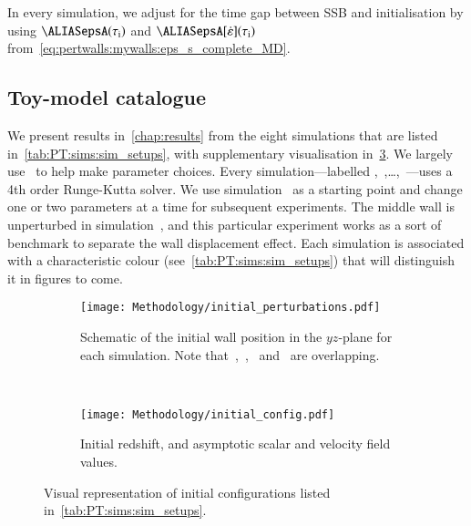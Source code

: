 
    In every simulation, we adjust for the time gap between SSB and initialisation %
    by using $\epsA(\tau\ped{i})$ and $\epsA[\dot{\varepsilon}](\tau\ped{i})$ from~\cref{eq:pertwalls:mywalls:eps_s_complete_MD}.







\subsection{Toy-model catalogue}

   


    We present results in~\cref{chap:results} from the eight simulations that are listed in~\cref{tab:PT:sims:sim_setups}, with supplementary visualisation in~\cref{fig:PT:sims:initial_configs}. %
    We largely use~\citet{christiansenAsimulationDomainFormation2024} to help make parameter choices. 
    Every simulation---labelled ,~,\dots,~---uses a 4th order Runge-Kutta solver. 
    We use simulation~ as a starting point and change one or two parameters at a time for subsequent experiments. The middle wall is unperturbed in simulation~, and this particular experiment works as a sort of benchmark to separate the wall displacement effect. 
    Each simulation is associated with a characteristic colour (see~\cref{tab:PT:sims:sim_setups}) that will distinguish it in figures to come.

    \begin{figure}[ht]
        \centering
        \begin{subfigure}[t]{0.62\linewidth}
            \centering
            \texttt{[image: Methodology/initial\_perturbations.pdf]}
            \caption{Schematic of the initial wall position in the $yz$-plane for each simulation. Note that~,~,~ and~ are overlapping.} %
            \label{fig:PT:sims:intital_perturbations}
        \end{subfigure}
        ~
        \begin{subfigure}[t]{0.32\linewidth}
            \centering
            \texttt{[image: Methodology/initial\_config.pdf]}
            \caption{Initial redshift, and asymptotic scalar and velocity field values.}
            \label{fig:PT:sims:initial_config}
        \end{subfigure}
        \caption{Visual representation of initial configurations listed in~\cref{tab:PT:sims:sim_setups}.}
        \label{fig:PT:sims:initial_configs}
    \end{figure}


